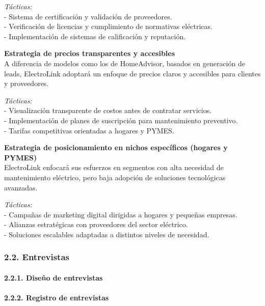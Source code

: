 \emph{Tácticas:}\\
- Sistema de certificación y validación de proveedores.\\
- Verificación de licencias y cumplimiento de normativas eléctricas.\\
- Implementación de sistemas de calificación y reputación.

\textbf{Estrategia de precios transparentes y accesibles}\\
A diferencia de modelos como los de HomeAdvisor, basados en generación
de leads, ElectroLink adoptará un enfoque de precios claros y accesibles
para clientes y proveedores.

\emph{Tácticas:}\\
- Visualización transparente de costos antes de contratar servicios.\\
- Implementación de planes de suscripción para mantenimiento
preventivo.\\
- Tarifas competitivas orientadas a hogares y PYMES.

\textbf{Estrategia de posicionamiento en nichos específicos (hogares y
PYMES)}\\
ElectroLink enfocará sus esfuerzos en segmentos con alta necesidad de
mantenimiento eléctrico, pero baja adopción de soluciones tecnológicas
avanzadas.

\emph{Tácticas:}\\
- Campañas de marketing digital dirigidas a hogares y pequeñas
empresas.\\
- Alianzas estratégicas con proveedores del sector eléctrico.\\
- Soluciones escalables adaptadas a distintos niveles de necesidad.

\subsubsection{2.2.
Entrevistas}\label{report__20-cap2-requirements-analysis.md__entrevistas}

\paragraph{2.2.1. Diseño de
entrevistas}\label{report__20-cap2-requirements-analysis.md__diseuxf1o-de-entrevistas}

\paragraph{2.2.2. Registro de
entrevistas}\label{report__20-cap2-requirements-analysis.md__registro-de-entrevistas}

